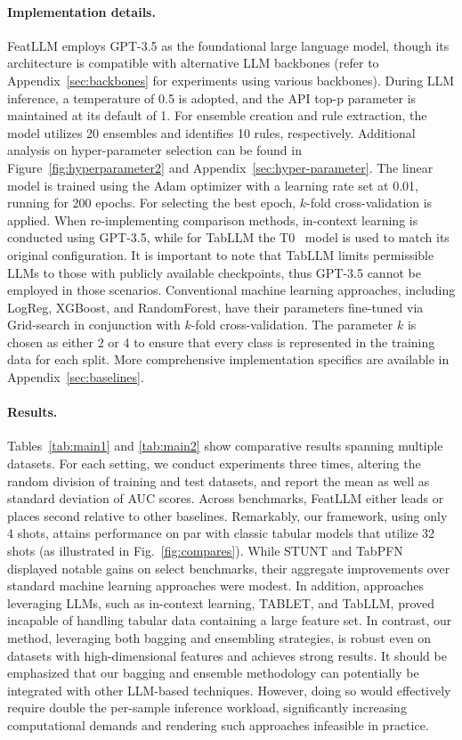 \paragraph{Implementation details.}
\textsf{FeatLLM} employs GPT-3.5 as the foundational large language model, though its architecture is compatible with alternative LLM backbones (refer to Appendix~\ref{sec:backbones} for experiments using various backbones). During LLM inference, a temperature of 0.5 is adopted, and the API top-p parameter is maintained at its default of 1. For ensemble creation and rule extraction, the model utilizes 20 ensembles and identifies 10 rules, respectively. Additional analysis on hyper-parameter selection can be found in Figure~\ref{fig:hyperparameter2} and Appendix~\ref{sec:hyper-parameter}. The linear model is trained using the Adam optimizer with a learning rate set at 0.01, running for 200 epochs. For selecting the best epoch, $k$-fold cross-validation is applied. When re-implementing comparison methods, in-context learning is conducted using GPT-3.5, while for TabLLM the T0~\cite{sanh2022multitask} model is used to match its original configuration. It is important to note that TabLLM limits permissible LLMs to those with publicly available checkpoints, thus GPT-3.5 cannot be employed in those scenarios. Conventional machine learning approaches, including LogReg, XGBoost, and RandomForest, have their parameters fine-tuned via Grid-search in conjunction with $k$-fold cross-validation. The parameter $k$ is chosen as either 2 or 4 to ensure that every class is represented in the training data for each split. More comprehensive implementation specifics are available in Appendix~\ref{sec:baselines}.

\vspace*{-0.12in}
\paragraph{Results.}
Tables~\ref{tab:main1} and \ref{tab:main2} show comparative results spanning multiple datasets. For each setting, we conduct experiments three times, altering the random division of training and test datasets, and report the mean as well as standard deviation of AUC scores. Across benchmarks, \textsf{FeatLLM} either leads or places second relative to other baselines. Remarkably, our framework, using only 4 shots, attains performance on par with classic tabular models that utilize 32 shots (as illustrated in Fig.~\ref{fig:compares}). While STUNT and TabPFN displayed notable gains on select benchmarks, their aggregate improvements over standard machine learning approaches were modest. In addition, approaches leveraging LLMs, such as in-context learning, TABLET, and TabLLM, proved incapable of handling tabular data containing a large feature set. In contrast, our method, leveraging both bagging and ensembling strategies, is robust even on datasets with high-dimensional features and achieves strong results. It should be emphasized that our bagging and ensemble methodology can potentially be integrated with other LLM-based techniques. However, doing so would effectively require double the per-sample inference workload, significantly increasing computational demands and rendering such approaches infeasible in practice.

